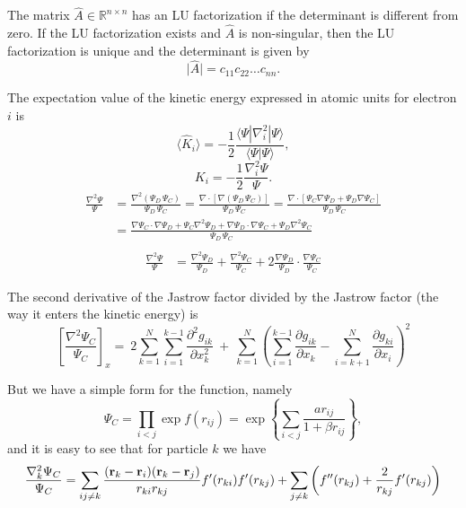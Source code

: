 \documentclass[graybox,sectrefs,envcountresetchap,open=right]{svmonodo}
\begin{document}
The matrix $\hat{A}\in \mathbb{R}^{n\times n}$ has an LU factorization if the determinant 
is different from zero. If the LU factorization exists and $\hat{A}$ is non-singular, then the LU factorization
is unique and the determinant is given by 
\[
\vert\hat{A}\vert
  = c_{11}c_{22}\dots c_{nn}.
\]





The expectation value of the kinetic energy expressed in atomic units for electron $i$ is 
\[
 \langle \hat{K}_i \rangle = -\frac{1}{2}\frac{\langle\Psi|\nabla_{i}^2|\Psi \rangle}{\langle\Psi|\Psi \rangle},
\]
\begin{equation}
\label{kineticE}
K_i = -\frac{1}{2}\frac{\nabla_{i}^{2} \Psi}{\Psi}.
\end{equation}
\begin{align}
\frac{\nabla^2 \Psi}{\Psi} & =  \frac{\nabla^2 ({\Psi_{D} \,  \Psi_C})}{\Psi_{D} \,  \Psi_C} = \frac{\nabla  \cdot [\nabla  {(\Psi_{D} \,  \Psi_C)}]}{\Psi_{D} \,  \Psi_C} = \frac{\nabla  \cdot [ \Psi_C \nabla  \Psi_{D} + \Psi_{D} \nabla   \Psi_C]}{\Psi_{D} \,  \Psi_C}\nonumber\\
&  =  \frac{\nabla   \Psi_C \cdot \nabla  \Psi_{D} +  \Psi_C \nabla^2 \Psi_{D} + \nabla  \Psi_{D} \cdot \nabla   \Psi_C + \Psi_{D} \nabla^2  \Psi_C}{\Psi_{D} \,  \Psi_C}\nonumber\\
\end{align}
\begin{align}
\frac{\nabla^2 \Psi}{\Psi}
& =  \frac{\nabla^2 \Psi_{D}}{\Psi_{D}} + \frac{\nabla^2  \Psi_C}{ \Psi_C} + 2 \frac{\nabla  \Psi_{D}}{\Psi_{D}}\cdot\frac{\nabla   \Psi_C}{ \Psi_C}
\end{align}





The second derivative of the Jastrow factor divided by the Jastrow factor (the way it enters the kinetic energy) is
\[
\left[\frac{\nabla^2 \Psi_C}{\Psi_C}\right]_x =\  
2\sum_{k=1}^{N}
\sum_{i=1}^{k-1}\frac{\partial^2 g_{ik}}{\partial x_k^2}\ +\ 
\sum_{k=1}^N
\left(
\sum_{i=1}^{k-1}\frac{\partial g_{ik}}{\partial x_k} -
\sum_{i=k+1}^{N}\frac{\partial g_{ki}}{\partial x_i}
\right)^2
\]


But we have a simple form for the function, namely
\[
\Psi_{C}=\prod_{i< j}\exp{f(r_{ij})}= \exp{\left\{\sum_{i<j}\frac{ar_{ij}}{1+\beta r_{ij}}\right\}},
\]
and it is easy to see that for particle  $k$
we have
\[
  \frac{\nabla^2_k \Psi_C}{\Psi_C }=
\sum_{ij\ne k}\frac{({\bf r}_k-{\bf r}_i)({\bf r}_k-{\bf r}_j)}{r_{ki}r_{kj}}f'(r_{ki})f'(r_{kj})+
\sum_{j\ne k}\left( f''(r_{kj})+\frac{2}{r_{kj}}f'(r_{kj})\right)
\]
\end{document}
